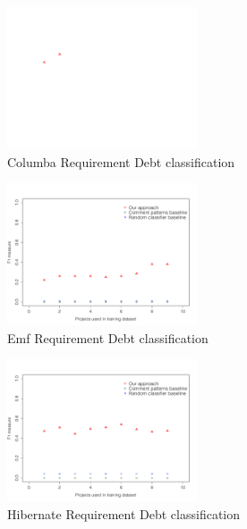 \begin{figure}[thb!]
  \centering
  \includegraphics[width=0.50\textwidth]{figures/appendix/iteration_details/implementation_columba.pdf}
  \vspace{-3mm}
  \caption{Columba Requirement Debt classification}
  \label{fig:implementation_columba}
\end{figure}

\begin{figure}[thb!]
  \centering
  \includegraphics[width=0.50\textwidth]{figures/appendix/iteration_details/implementation_emf.pdf}
  \vspace{-3mm}
  \caption{Emf Requirement Debt classification}
  \label{fig:implementation_emf}
\end{figure}

\clearpage

\begin{figure}[thb!]
  \centering
  \includegraphics[width=0.50\textwidth]{figures/appendix/iteration_details/implementation_hibernate.pdf}
  \caption{Hibernate Requirement Debt classification}
  \label{fig:implementation_hibernate}
\end{figure}

